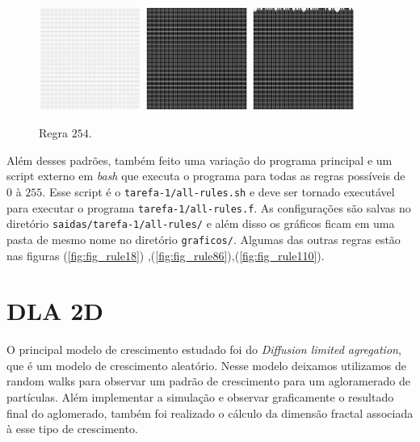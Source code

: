 \documentclass[a4paper, 11pt]{tufte-handout}
\begin{document}
\begin{figure}[h!]
  \centering
  \includegraphics[width=0.3\textwidth]{tarefa-1/rule-254-0.png}
  \includegraphics[width=0.3\textwidth]{tarefa-1/rule-254-1.png}
  \includegraphics[width=0.3\textwidth]{tarefa-1/rule-254-2.png}
  \caption{Regra $254$.}
\end{figure}


Além desses padrões, também feito uma variação do programa principal e um script
externo em \emph{bash} que executa o programa para todas as regras possíveis de \( 0 \) à \( 255 \).
Esse script é o \verb|tarefa-1/all-rules.sh| e deve ser tornado executável para executar o programa
\verb|tarefa-1/all-rules.f|. As configurações são salvas no diretório
\verb|saidas/tarefa-1/all-rules/| e além disso os gráficos ficam em uma pasta de mesmo nome no
diretório \verb|graficos/|. Algumas das outras regras estão nas figuras (\ref{fig:fig_rule18})
,(\ref{fig:fig_rule86}),(\ref{fig:fig_rule110}).




\clearpage
\section{DLA 2D}
O principal modelo de crescimento estudado foi do \emph{Diffusion limited agregation}, que é um
modelo de crescimento aleatório. Nesse modelo deixamos utilizamos de random walks para observar um
padrão de crescimento para um agloramerado de partículas. Além implementar a simulação e observar
graficamente o resultado final do aglomerado, também foi realizado o cálculo da dimensão fractal
associada à esse tipo de crescimento.
\end{document}
